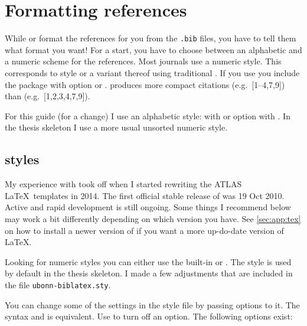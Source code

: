 \section{Formatting references}%
\label{sec:ref:format}

While \BibTeX{} or  format the references for you
from the \texttt{.bib} files, you have to tell them what format you
want!  For a start, you have to choose between an alphabetic and a
numeric scheme for the references. Most journals use a numeric
style. This corresponds to style  or a variant thereof
using traditional \BibTeX.  If you use  you include the
package with option  or
.  produces more compact
citations (e.g.\ [1--4,7,9]) than  (e.g.\ [1,2,3,4,7,9]).

For this guide (for a change) I use an alphabetic style:
 with \BibTeX{} or option  with
. In the thesis skeleton I use a more usual unsorted
numeric style.


\subsection{ styles}%
\label{sec:ref:bbx}

My experience with  took off 
when I started rewriting the ATLAS \LaTeX\ templates in 2014.
The first official stable release of  was 19 Oct 2010.
Active and rapid development is still ongoing.
Some things I recommend below may work a bit differently depending on which version
you have. See \cref{sec:app:tex} on how to install a newer
version of \TeXLive if you want a more up-do-date version of \LaTeX.

Looking for numeric styles you can either use the built-in
 or .
The  style is used by default in the thesis skeleton.
I made a few adjustments that are included in the file
\texttt{ubonn-biblatex.sty}.

You can change some of the settings in the style file by passing options to it.
The syntax  and  is equivalent.
Use  to turn off an option.
The following options exist:

